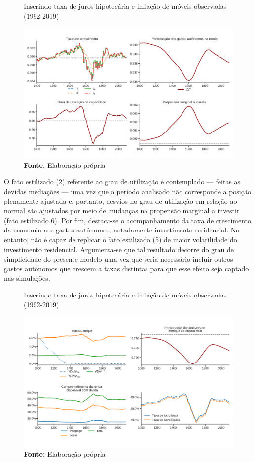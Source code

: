 \begin{figure}[H]
	\centering
	\caption{Inserindo taxa de juros hipotecária e inflação de móveis observadas (1992-2019)}
	\label{choque_Real}
	\includegraphics[width=\textwidth]{../../Modelo/Versoes/Shock_Real.png}
	\caption*{\textbf{Fonte:} Elaboração própria}
\end{figure}


O fato estilizado (2) referente ao grau de utilização é contemplado --- feitas as devidas mediações --- uma vez que o período analisado não corresponde a posição plenamente ajustada e, portanto, desvios no grau de utilização em relação ao normal são ajustados por meio de mudanças na propensão marginal a investir (fato estilizado 6). Por fim, destaca-se o acompanhamento da taxa de crescimento da economia aos gastos autônomos, notadamente investimento residencial. No entanto, não é capaz de replicar o fato estilizado (5) de maior volatilidade do investimento residencial.
Argumenta-se que tal resultado decorre do grau de simplicidade do presente modelo uma vez que seria necessário incluir outros gastos autônomos que crescem a taxas distintas para que esse efeito seja captado nas simulações.

\begin{figure}[H]
	\centering
	\caption{Inserindo taxa de juros hipotecária e inflação de móveis observadas (1992-2019)}
	\label{choque_RealNorms}
	\includegraphics[width=\textwidth]{../../Modelo/Versoes/Shock_RealNorms.png}
	\caption*{\textbf{Fonte:} Elaboração própria}
\end{figure}

